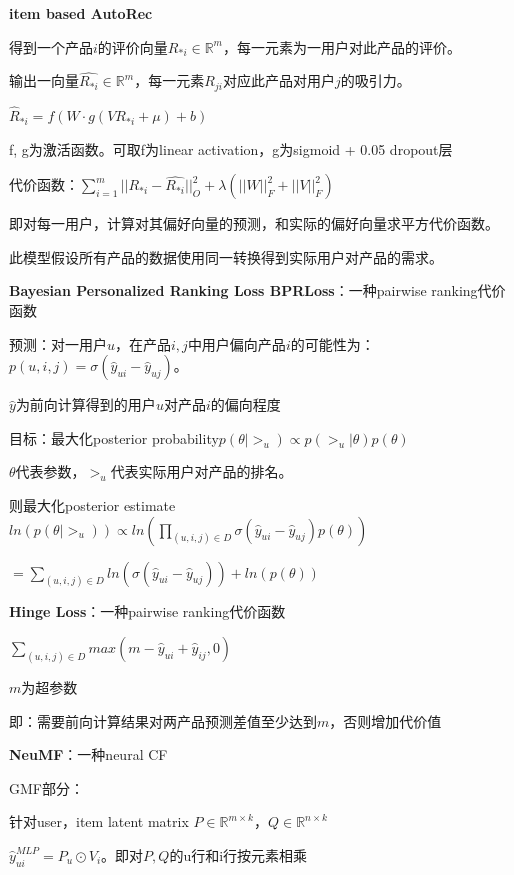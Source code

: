 \documentclass[UTF8]{ctexart}
\begin{document}
  \textbf{item based AutoRec}

  \quad 得到一个产品$i$的评价向量$R_{*i} \in \mathbb{R}^m$，每一元素为一用户对此产品的评价。
  
  \quad 输出一向量$\hat{R_{*i}} \in \mathbb{R}^m$，每一元素$R_{ji}$对应此产品对用户$j$的吸引力。

  \quad $\hat{R}_{*i} = f(W \cdot g(VR_{*i} + \mu) + b)$

  \quad \quad f, g为激活函数。可取f为linear activation，g为sigmoid + 0.05 dropout层

  \quad 代价函数：$\sum_{i=1}^{m}||R_{*i} - \hat{R_{*i}}||_O^2 + \lambda (||W||_F^2 + ||V||_F^2)$

  \quad \quad 即对每一用户，计算对其偏好向量的预测，和实际的偏好向量求平方代价函数。

  \quad \quad 此模型假设所有产品的数据使用同一转换得到实际用户对产品的需求。

  \textbf{Bayesian Personalized Ranking Loss BPRLoss}：一种pairwise ranking代价函数

  \quad 预测：对一用户$u$，在产品$i, j$中用户偏向产品$i$的可能性为：$p(u, i, j) = \sigma(\hat{y}_{ui} - \hat{y}_{uj})$。
  
  \quad \quad $\hat{y}$为前向计算得到的用户$u$对产品$i$的偏向程度

  \quad 目标：最大化posterior probability$p(\theta | >_u) \propto p(>_u | \theta)p(\theta)$

  \quad \quad $\theta$代表参数，$>_u$代表实际用户对产品的排名。

  \quad \quad 则最大化posterior estimate$ln(p(\theta | >_u)) \propto ln(\prod_{(u, i, j) \in D} \sigma(\hat{y}_{ui} - \hat{y}_{uj})p(\theta))$

  \quad \quad \quad $ = \sum_{(u, i, j) \in D} ln(\sigma(\hat{y}_{ui} - \hat{y}_{uj})) + ln(p(\theta))$

  \textbf{Hinge Loss}：一种pairwise ranking代价函数

  \quad $\sum_{(u, i, j) \in D} max(m - \hat{y}_{ui} + \hat{y}_{ij}, 0)$

  \quad \quad $m$为超参数

  \quad \quad 即：需要前向计算结果对两产品预测差值至少达到$m$，否则增加代价值

  \textbf{NeuMF}：一种neural CF

  \quad GMF部分：

  \quad \quad 针对user，item latent matrix $P \in \mathbb{R}^{m \times k}$，$Q \in \mathbb{R}^{n \times k}$

  \quad \quad $\hat{y}_{ui}^{MLP} = P_u \odot V_i$。即对$P, Q$的u行和i行按元素相乘
  
\end{document}
